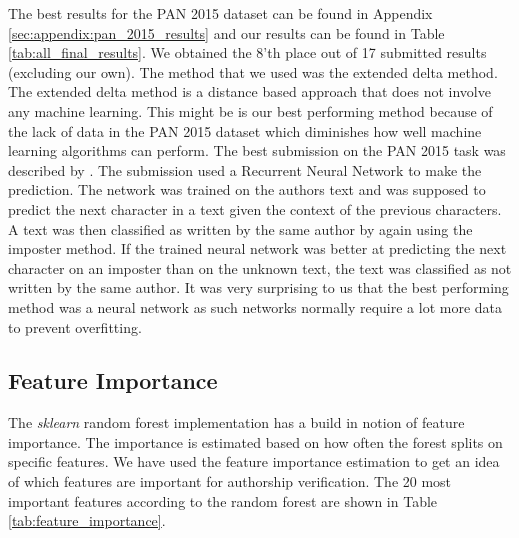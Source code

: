 The best results for the PAN 2015 dataset can be found in Appendix
\ref{sec:appendix:pan_2015_results} and our results can be found in Table
\ref{tab:all_final_results}. We obtained the 8'th place out of 17 submitted
results (excluding our own). The method that we used was the extended delta
method. The extended delta method is a distance based approach that does not
involve any machine learning. This might be is our best performing method
because of the lack of data in the PAN 2015 dataset which diminishes how well
machine learning algorithms can perform. The best submission on the PAN 2015
task was described by \cite{bagnall:2015}. The submission used a Recurrent
Neural Network to make the prediction. The network was trained on the authors
text and was supposed to predict the next character in a text given the context
of the previous characters. A text was then classified as written by the same
author by again using the imposter method. If the trained neural network was
better at predicting the next character on an imposter than on the unknown
text, the text was classified as not written by the same author. It was very
surprising to us that the best performing method was a neural network as such
networks normally require a lot more data to prevent overfitting.




\subsection{Feature Importance}
The \textit{sklearn} random forest implementation has a build in notion of
feature importance. The importance is estimated based on how often the forest
splits on specific features. We have used the feature importance estimation to
get an idea of which features are important for authorship verification. The 20
most important features according to the random forest are shown in Table
\ref{tab:feature_importance}.

